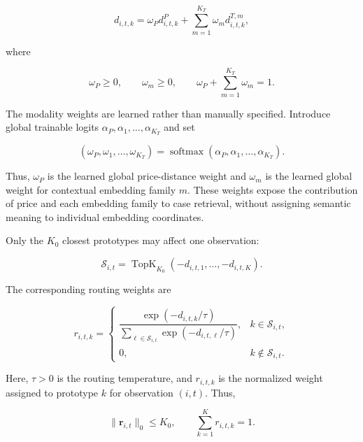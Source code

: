 \documentclass[11pt]{article}
\begin{document}
\begin{equation}
d_{i,t,k}
=
\omega_Pd^P_{i,t,k}
+
\sum_{m=1}^{K_T}
\omega_md^{T,m}_{i,t,k},
\end{equation}

where

\begin{equation}
\omega_P\geq0,
\qquad
\omega_m\geq0,
\qquad
\omega_P+\sum_{m=1}^{K_T}\omega_m=1.
\end{equation}

The modality weights are learned rather than manually specified. Introduce
global trainable logits $\alpha_P,\alpha_1,\ldots,\alpha_{K_T}$ and set

\begin{equation}
\left(
\omega_P,\omega_1,\ldots,\omega_{K_T}
\right)
=
\operatorname{softmax}
\left(
\alpha_P,\alpha_1,\ldots,\alpha_{K_T}
\right).
\end{equation}

Thus, $\omega_P$ is the learned global price-distance weight and $\omega_m$ is
the learned global weight for contextual embedding family $m$. These weights
expose the contribution of price and each embedding family to case retrieval,
without assigning semantic meaning to individual embedding coordinates.

Only the $K_0$ closest prototypes may affect one observation:

\begin{equation}
\mathcal S_{i,t}
=
\operatorname{TopK}_{K_0}
\left(
-d_{i,t,1},\ldots,-d_{i,t,K}
\right).
\end{equation}

The corresponding routing weights are

\begin{equation}
r_{i,t,k}
=
\begin{cases}
\dfrac{
\exp(-d_{i,t,k}/\tau)
}{
\displaystyle
\sum_{\ell\in\mathcal S_{i,t}}
\exp(-d_{i,t,\ell}/\tau)
},
&
k\in\mathcal S_{i,t},
\\[3ex]
0,
&
k\notin\mathcal S_{i,t}.
\end{cases}
\end{equation}

Here, $\tau>0$ is the routing temperature, and $r_{i,t,k}$ is the normalized
weight assigned to prototype $k$ for observation $(i,t)$. Thus,

\begin{equation}
\|\mathbf r_{i,t}\|_0\leq K_0,
\qquad
\sum_{k=1}^{K}r_{i,t,k}=1.
\end{equation}
\end{document}

